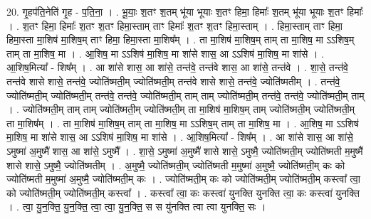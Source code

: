 \documentclass[17pt]{extarticle}
\begin{document}
20. गृ॒हप॑ति॒नेति॑ गृ॒ह - प॒ति॒ना॒ । . भू॒याः॒ श॒तꣳ श॒तम् भू॑या भूयाः श॒तꣳ हिमा॒ हिमाः᳚ श॒तम् भू॑या भूयाः श॒तꣳ हिमाः᳚ । . श॒तꣳ हिमा॒ हिमाः᳚ श॒तꣳ श॒तꣳ हिमा॒स्ताम् ताꣳ हिमाः᳚ श॒तꣳ श॒तꣳ हिमा॒स्ताम् । . हिमा॒स्ताम् ताꣳ हिमा॒ हिमा॒स्ता मा॒शिष॑ मा॒शिष॒म् ताꣳ हिमा॒ हिमा॒स्ता मा॒शिष᳚म् । . ता मा॒शिष॑ मा॒शिष॒म् ताम् ता मा॒शिष॒ मा ऽऽशिष॒म् ताम् ता मा॒शिष॒ मा । . आ॒शिष॒ मा ऽऽशिष॑ मा॒शिष॒ मा शा॑से शास॒ आ ऽऽशिष॑ मा॒शिष॒ मा शा॑से । . आ॒शिष॒मित्या᳚ - शिष᳚म् । . आ शा॑से शास॒ आ शा॑से॒ तन्त॑वे॒ तन्त॑वे शास॒ आ शा॑से॒ तन्त॑वे । . शा॒से॒ तन्त॑वे॒ तन्त॑वे शासे शासे॒ तन्त॑वे॒ ज्योति॑ष्मती॒म् ज्योति॑ष्मती॒म् तन्त॑वे शासे शासे॒ तन्त॑वे॒ ज्योति॑ष्मतीम् । . तन्त॑वे॒ ज्योति॑ष्मती॒म् ज्योति॑ष्मती॒म् तन्त॑वे॒ तन्त॑वे॒ ज्योति॑ष्मती॒म् ताम् ताम् ज्योति॑ष्मती॒म् तन्त॑वे॒ तन्त॑वे॒ ज्योति॑ष्मती॒म् ताम् । . ज्योति॑ष्मती॒म् ताम् ताम् ज्योति॑ष्मती॒म् ज्योति॑ष्मती॒म् ता मा॒शिष॑ मा॒शिष॒म् ताम् ज्योति॑ष्मती॒म् ज्योति॑ष्मती॒म् ता मा॒शिष᳚म् । . ता मा॒शिष॑ मा॒शिष॒म् ताम् ता मा॒शिष॒ मा ऽऽशिष॒म् ताम् ता मा॒शिष॒ मा । . आ॒शिष॒ मा ऽऽशिष॑ मा॒शिष॒ मा शा॑से शास॒ आ ऽऽशिष॑ मा॒शिष॒ मा शा॑से । . आ॒शिष॒मित्या᳚ - शिष᳚म् । . आ शा॑से शास॒ आ शा॑से॒ ऽमुष्मा॑ अ॒मुष्मै॑ शास॒ आ शा॑से॒ ऽमुष्मै᳚ । . शा॒से॒ ऽमुष्मा॑ अ॒मुष्मै॑ शासे शासे॒ ऽमुष्मै॒ ज्योति॑ष्मती॒म् ज्योति॑ष्मती म॒मुष्मै॑ शासे शासे॒ ऽमुष्मै॒ ज्योति॑ष्मतीम् । . अ॒मुष्मै॒ ज्योति॑ष्मती॒म् ज्योति॑ष्मती म॒मुष्मा॑ अ॒मुष्मै॒ ज्योति॑ष्मती॒म् कः को ज्योति॑ष्मती म॒मुष्मा॑ अ॒मुष्मै॒ ज्योति॑ष्मती॒म् कः । . ज्योति॑ष्मती॒म् कः को ज्योति॑ष्मती॒म् ज्योति॑ष्मती॒म् कस्त्वा᳚ त्वा॒ को ज्योति॑ष्मती॒म् ज्योति॑ष्मती॒म् कस्त्वा᳚ । . कस्त्वा᳚ त्वा॒ कः कस्त्वा॑ युनक्ति युनक्ति त्वा॒ कः कस्त्वा॑ युनक्ति । . त्वा॒ यु॒न॒क्ति॒ यु॒न॒क्ति॒ त्वा॒ त्वा॒ यु॒न॒क्ति॒ स स यु॑नक्ति त्वा त्वा युनक्ति॒ सः । \newline
\end{document}
